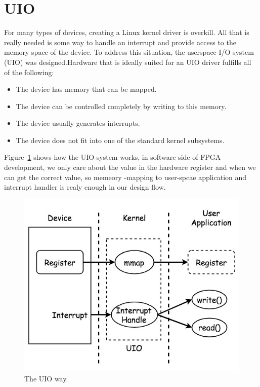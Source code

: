 
\section{UIO}
\label{sec:UIO}
For many types of devices, creating a Linux kernel driver is overkill. All that is really needed 
is some way to handle an interrupt and provide access to the memory space of the device. To address 
this situation, the userspace I/O system (UIO) was designed.Hardware that is ideally suited for an 
UIO driver fulfills all of the following:
%
\begin{itemize}
\item The device has memory that can be mapped.
\item The device can be controlled completely by writing to this memory.
\item The device usually generates interrupts.
\item The device does not fit into one of the standard kernel subsystems.
\end{itemize}
%
Figure~\ref{fig:UIO Driver} shows how the UIO system works, in software-side of FPGA development, we 
only care about the value in the hardware register and when we can get the correct value, so memeory
-mapping to user-spcae application and interrupt handler is realy enough in our design flow.  
%
\begin{figure}[!htb]
  \centering
  \includegraphics[scale=0.5]{images/uio.jpg}
  \caption[The UIO way.]{The UIO way.}
  \label{fig:UIO Driver}
\end{figure}

